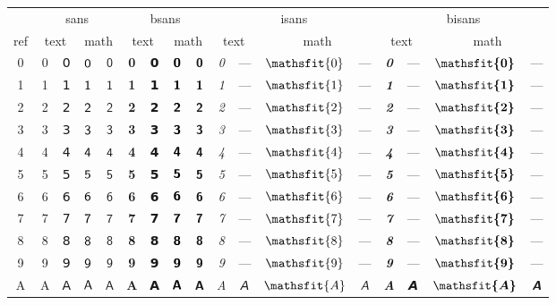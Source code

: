 \documentclass[10pt]{standalone}
\newcommand{\SANS}[1]{\ifmmode\mathsf{#1}\else\textsf{#1}\fi}
\newcommand{\BSANS}[1]{\ifmmode\boldsymbol{\mathsf{#1}}\else\textbf{\textsf{#1}}\fi}
\newcommand{\ISANS}[1]{\ifmmode\mathsfit{#1}\else\textit{\textsf{#1}}\fi}
\newcommand{\BISANS}[1]{\ifmmode\bm{\mathsfit{#1}}\else\textbf{\textsf{\textit{#1}}}\fi}
\begin{document}
\begin{tabular}{c|cc|cc|cc|cc|cc|cc|cc|cc}  %
\toprule
&\multicolumn{4}{c|}{sans} & \multicolumn{4}{|c}{bsans} & \multicolumn{4}{|c}{isans} & \multicolumn{4}{|c}{bisans} \\
ref&\multicolumn{2}{c|}{text} & \multicolumn{2}{|c|}{math} & \multicolumn{2}{|c|}{text} & \multicolumn{2}{|c}{math}
& \multicolumn{2}{|c|}{text} & \multicolumn{2}{|c}{math} & \multicolumn{2}{|c|}{text} & \multicolumn{2}{|c}{math} \\
\midrule
0 & \SANS{0} & 𝟢 & $\SANS{0}$ & $𝟢$ & \BSANS{0} & 𝟬 & $\BSANS{0}$ & $𝟬$ & \ISANS{0} & — & $\ISANS{0}$ & $—$ & \BISANS{0} & — & $\BISANS{0}$ & $—$ \\
1 & \SANS{1} & 𝟣 & $\SANS{1}$ & $𝟣$ & \BSANS{1} & 𝟭 & $\BSANS{1}$ & $𝟭$ & \ISANS{1} & — & $\ISANS{1}$ & $—$ & \BISANS{1} & — & $\BISANS{1}$ & $—$ \\
2 & \SANS{2} & 𝟤 & $\SANS{2}$ & $𝟤$ & \BSANS{2} & 𝟮 & $\BSANS{2}$ & $𝟮$ & \ISANS{2} & — & $\ISANS{2}$ & $—$ & \BISANS{2} & — & $\BISANS{2}$ & $—$ \\
3 & \SANS{3} & 𝟥 & $\SANS{3}$ & $𝟥$ & \BSANS{3} & 𝟯 & $\BSANS{3}$ & $𝟯$ & \ISANS{3} & — & $\ISANS{3}$ & $—$ & \BISANS{3} & — & $\BISANS{3}$ & $—$ \\
4 & \SANS{4} & 𝟦 & $\SANS{4}$ & $𝟦$ & \BSANS{4} & 𝟰 & $\BSANS{4}$ & $𝟰$ & \ISANS{4} & — & $\ISANS{4}$ & $—$ & \BISANS{4} & — & $\BISANS{4}$ & $—$ \\
5 & \SANS{5} & 𝟧 & $\SANS{5}$ & $𝟧$ & \BSANS{5} & 𝟱 & $\BSANS{5}$ & $𝟱$ & \ISANS{5} & — & $\ISANS{5}$ & $—$ & \BISANS{5} & — & $\BISANS{5}$ & $—$ \\
6 & \SANS{6} & 𝟨 & $\SANS{6}$ & $𝟨$ & \BSANS{6} & 𝟲 & $\BSANS{6}$ & $𝟲$ & \ISANS{6} & — & $\ISANS{6}$ & $—$ & \BISANS{6} & — & $\BISANS{6}$ & $—$ \\
7 & \SANS{7} & 𝟩 & $\SANS{7}$ & $𝟩$ & \BSANS{7} & 𝟳 & $\BSANS{7}$ & $𝟳$ & \ISANS{7} & — & $\ISANS{7}$ & $—$ & \BISANS{7} & — & $\BISANS{7}$ & $—$ \\
8 & \SANS{8} & 𝟪 & $\SANS{8}$ & $𝟪$ & \BSANS{8} & 𝟴 & $\BSANS{8}$ & $𝟴$ & \ISANS{8} & — & $\ISANS{8}$ & $—$ & \BISANS{8} & — & $\BISANS{8}$ & $—$ \\
9 & \SANS{9} & 𝟫 & $\SANS{9}$ & $𝟫$ & \BSANS{9} & 𝟵 & $\BSANS{9}$ & $𝟵$ & \ISANS{9} & — & $\ISANS{9}$ & $—$ & \BISANS{9} & — & $\BISANS{9}$ & $—$ \\
\midrule
A & \SANS{A} & 𝖠 & $\SANS{A}$ & $𝖠$ & \BSANS{A} & 𝗔 & $\BSANS{A}$ & $𝗔$ & \ISANS{A} & 𝘈 & $\ISANS{A}$ & $𝘈$ & \BISANS{A} & 𝘼 & $\BISANS{A}$ & $𝘼$  \\

\end{tabular}
\end{document}
